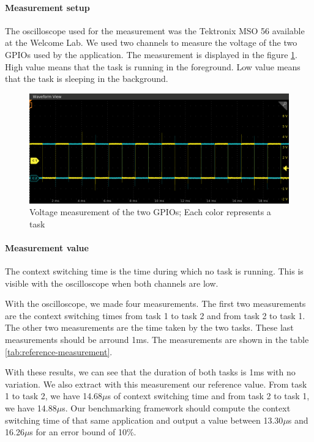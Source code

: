 \paragraph{Measurement setup}

The oscilloscope used for the measurement was the Tektronix MSO 56 available at the Welcome Lab.
We used two channels to measure the voltage of the two GPIOs used by the application.
The measurement is displayed in the figure \ref{fig:measurement-value-wave}.
High value means that the task is running in the foreground.
Low value means that the task is sleeping in the background.

\begin{figure}[!ht]
  \centering
  \includegraphics[scale=0.5]{assets/measurement-value-wave.png}
  \caption{\label{fig:measurement-value-wave}Voltage measurement of the two GPIOs; Each color represents a task}
\end{figure}

\paragraph{Measurement value}

The context switching time is the time during which no task is running.
This is visible with the oscilloscope when both channels are low.

With the oscilloscope, we made four measurements.
The first two measurements are the context switching times from task 1 to task 2 and from task 2 to task 1.
The other two measurements are the time taken by the two tasks.
These last measurements should be arround 1ms.
The measurements are shown in the table \ref{tab:reference-measurement}.

With these results, we can see that the duration of both tasks is 1ms with no variation.
We also extract with this measurement our reference value.
From task 1 to task 2, we have 14.68$\mu$s of context switching time and from task 2 to task 1, we have 14.88$\mu$s.
Our benchmarking framework should compute the context switching time of that same application and output a value between 13.30$\mu$s and 16.26$\mu$s for an error bound of 10\%.

